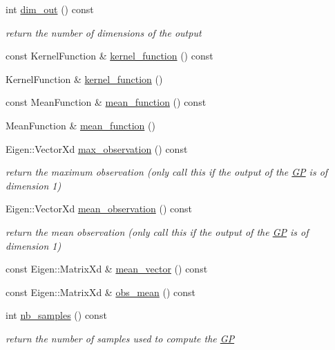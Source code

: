 \begin{DoxyCompactItemize}
int \hyperlink{classlimbo_1_1model_1_1_g_p_a077144695f9f0b33b64d4feb8fb4e447}{dim\+\_\+out} () const 
\begin{DoxyCompactList}\small\item\em return the number of dimensions of the output \end{DoxyCompactList}\item 
const Kernel\+Function \& \hyperlink{classlimbo_1_1model_1_1_g_p_aaf794227fb4b8ba92bc22f15ec379d87}{kernel\+\_\+function} () const 
\item 
Kernel\+Function \& \hyperlink{classlimbo_1_1model_1_1_g_p_a442ffded72288fd9ea360ce1456f72a4}{kernel\+\_\+function} ()
\item 
const Mean\+Function \& \hyperlink{classlimbo_1_1model_1_1_g_p_a29be4dfec28fbf0ab970529a18a20c34}{mean\+\_\+function} () const 
\item 
Mean\+Function \& \hyperlink{classlimbo_1_1model_1_1_g_p_ad4a56a3630793def38840ea1c85c091e}{mean\+\_\+function} ()
\item 
Eigen\+::\+Vector\+Xd \hyperlink{classlimbo_1_1model_1_1_g_p_a480f1b249edf89bc6960512e8baceab8}{max\+\_\+observation} () const 
\begin{DoxyCompactList}\small\item\em return the maximum observation (only call this if the output of the \hyperlink{classlimbo_1_1model_1_1_g_p}{G\+P} is of dimension 1) \end{DoxyCompactList}\item 
Eigen\+::\+Vector\+Xd \hyperlink{classlimbo_1_1model_1_1_g_p_a802d8d4750626e6d38d83d36166000ac}{mean\+\_\+observation} () const 
\begin{DoxyCompactList}\small\item\em return the mean observation (only call this if the output of the \hyperlink{classlimbo_1_1model_1_1_g_p}{G\+P} is of dimension 1) \end{DoxyCompactList}\item 
const Eigen\+::\+Matrix\+Xd \& \hyperlink{classlimbo_1_1model_1_1_g_p_ade0d93b847e3d112735b3e8143470a55}{mean\+\_\+vector} () const 
\item 
const Eigen\+::\+Matrix\+Xd \& \hyperlink{classlimbo_1_1model_1_1_g_p_aa9d3799fdcd71a8ccc19bc43932fa321}{obs\+\_\+mean} () const 
\item 
int \hyperlink{classlimbo_1_1model_1_1_g_p_ac490915c95cc78f6cd836f78e3638bf1}{nb\+\_\+samples} () const 
\begin{DoxyCompactList}\small\item\em return the number of samples used to compute the \hyperlink{classlimbo_1_1model_1_1_g_p}{G\+P} \end{DoxyCompactList}\item 

\end{DoxyCompactItemize}
